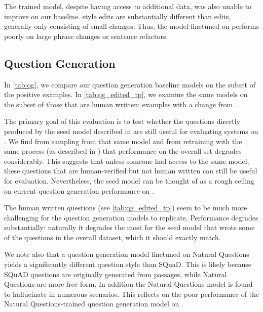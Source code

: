 The \vitaminc{} trained model, despite having access to additional data, was also unable to improve on our baseline. \vitaminc{} style edits are substantially different than \dataset{} edits, generally only consisting of small changes. Thus, the model finetuned on \vitaminc{} performs poorly on large phrase changes or sentence refactors. 


\subsection{Question Generation}


In \autoref{tab:qg}, we compare our question generation baseline models on the subset of the positive examples. In \autoref{tab:qg_edited_tp}, we examine the same models on the subset of those that are human written: examples with a change from .

% 



The primary goal of this evaluation is to test whether the questions directly produced by the seed model described in  are still useful for evaluating systems on \dataset{}. We find from sampling from that same model and from retraining with the same process (as described in ) that performance on the overall set degrades considerably. This suggests that unless someone had access to the same model, these questions that are human-verified but not human written can still be useful for evaluation.
%
Nevertheless, the seed model can be thought of as a rough ceiling on current question generation performance on \dataset{}.

The human written questions (see \autoref{tab:qg_edited_tp}) seem to be much more challenging for the question generation models to replicate. Performance degrades substantially: naturally it degrades the most for the seed model that wrote some of the questions in the overall dataset, which it should exactly match. 

We note also that a question generation model finetuned on Natural Questions  \citep{kwiatkowski-etal-2019-natural} yields a significantly different question style than SQuaD. This is likely because SQuAD questions are originally generated from passages, while Natural Questions are more free form. In addition the  Natural Questions  model is found to hallucinate in numerous scenarios.
This reflects on the poor performance of the Natural Questions-trained question generation model on \dataset{}. %


